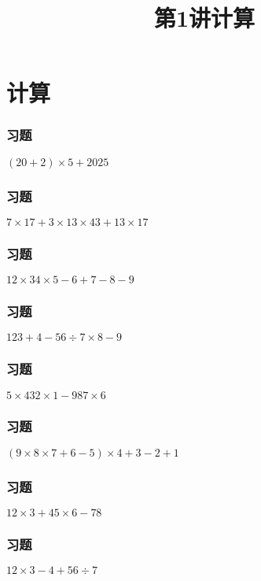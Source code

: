 \section{计算}

\title[第1讲\quad 计算]{第1讲\quad 计算} 
\author{}
\date{}
\begin{frame}
    \titlepage
\end{frame}

\begin{frame}
    \frametitle{习题\theframecounter}
    \vspace*{-1cm}
    \centering\textit{\Large $(20+2)\times 5 + 2025$}
\end{frame}

\begin{frame}
    \frametitle{习题\theframecounter}
    \vspace*{-1cm}
    \centering\textit{\Large $7\times 17 + 3\times 13\times 43 + 13\times 17$}
\end{frame}

\begin{frame}
    \frametitle{习题\theframecounter}
    \vspace*{-1cm}
    \centering\textit{\Large $12\times 34\times 5 - 6 + 7 - 8 - 9$}
\end{frame}

\begin{frame}
    \frametitle{习题\theframecounter}    \centering\textit{\Large $123 + 4 - 56\div 7\times 8 - 9$}
\end{frame}

\begin{frame}
    \frametitle{习题\theframecounter}    \centering\textit{\Large $5\times 432\times 1 - 98 7\times 6$}
\end{frame}

\begin{frame}
    \frametitle{习题\theframecounter}    \centering\textit{\Large $(9\times 8\times 7 + 6 - 5)\times 4 + 3 -2 +1$}
\end{frame}

\begin{frame}
    \frametitle{习题\theframecounter}    \centering\textit{\Large $12\times 3 + 45\times 6 - 78$}
\end{frame}

\begin{frame}
    \frametitle{习题\theframecounter}    \centering\textit{\Large $12\times 3 - 4 + 56\div 7$}
\end{frame}

